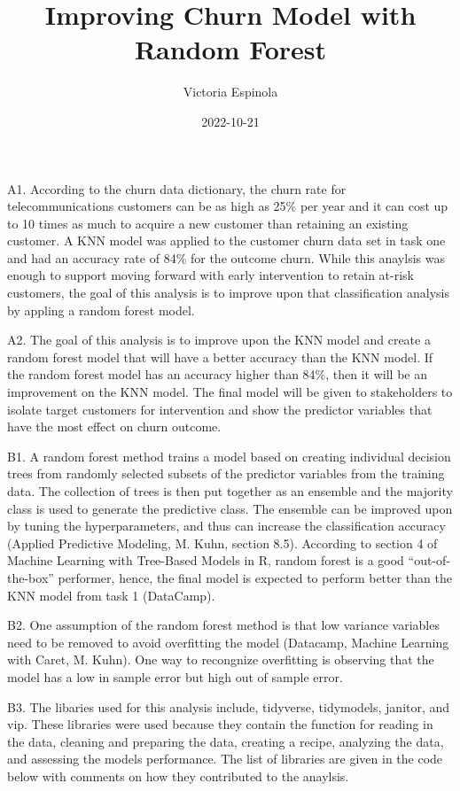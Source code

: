 \documentclass[
]{article}
\title{Improving Churn Model with Random Forest}
\author{Victoria Espinola}
\date{2022-10-21}
\begin{document}
\maketitle

A1. According to the churn data dictionary, the churn rate for
telecommunications customers can be as high as 25\% per year and it can
cost up to 10 times as much to acquire a new customer than retaining an
existing customer. A KNN model was applied to the customer churn data
set in task one and had an accuracy rate of 84\% for the outcome churn.
While this anaylsis was enough to support moving forward with early
intervention to retain at-risk customers, the goal of this analysis is
to improve upon that classification analysis by appling a random forest
model.

A2. The goal of this analysis is to improve upon the KNN model and
create a random forest model that will have a better accuracy than the
KNN model. If the random forest model has an accuracy higher than 84\%,
then it will be an improvement on the KNN model. The final model will be
given to stakeholders to isolate target customers for intervention and
show the predictor variables that have the most effect on churn outcome.

B1. A random forest method trains a model based on creating individual
decision trees from randomly selected subsets of the predictor variables
from the training data. The collection of trees is then put together as
an ensemble and the majority class is used to generate the predictive
class. The ensemble can be improved upon by tuning the hyperparameters,
and thus can increase the classification accuracy (Applied Predictive
Modeling, M. Kuhn, section 8.5). According to section 4 of Machine
Learning with Tree-Based Models in R, random forest is a good
``out-of-the-box'' performer, hence, the final model is expected to
perform better than the KNN model from task 1 (DataCamp).

B2. One assumption of the random forest method is that low variance
variables need to be removed to avoid overfitting the model (Datacamp,
Machine Learning with Caret, M. Kuhn). One way to recongnize overfitting
is observing that the model has a low in sample error but high out of
sample error.

B3. The libaries used for this analysis include, tidyverse, tidymodels,
janitor, and vip. These libraries were used because they contain the
function for reading in the data, cleaning and preparing the data,
creating a recipe, analyzing the data, and assessing the models
performance. The list of libraries are given in the code below with
comments on how they contributed to the anaylsis.
\end{document}
